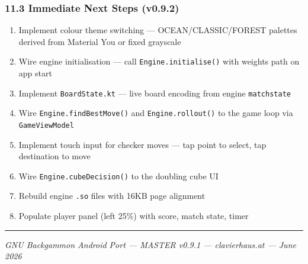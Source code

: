 \documentclass[11pt,a4paper]{article}
\providecommand{\tightlist}{\setlength{\itemsep}{2pt}\setlength{\parskip}{0pt}}
\begin{document}
\subsubsection{11.3 Immediate Next Steps
(v0.9.2)}\label{immediate-next-steps-v092}

\begin{enumerate}
\def\labelenumi{\arabic{enumi}.}
\tightlist
\item
  Implement colour theme switching --- OCEAN/CLASSIC/FOREST palettes
  derived from Material You or fixed grayscale
\item
  Wire engine initialisation --- call \texttt{Engine.initialise()}
  with weights path on app start
\item
  Implement \texttt{BoardState.kt} --- live board encoding from
  engine \texttt{matchstate}
\item
  Wire \texttt{Engine.findBestMove()} and \texttt{Engine.rollout()}
  to the game loop via \texttt{GameViewModel}
\item
  Implement touch input for checker moves --- tap point to select,
  tap destination to move
\item
  Wire \texttt{Engine.cubeDecision()} to the doubling cube UI
\item
  Rebuild engine \texttt{.so} files with 16KB page alignment
\item
  Populate player panel (left 25\%) with score, match state, timer
\end{enumerate}

\begin{center}\rule{0.5\linewidth}{0.5pt}\end{center}

\emph{GNU Backgammon Android Port --- MASTER v0.9.1 --- clavierhaus.at
--- June 2026}
\end{document}
